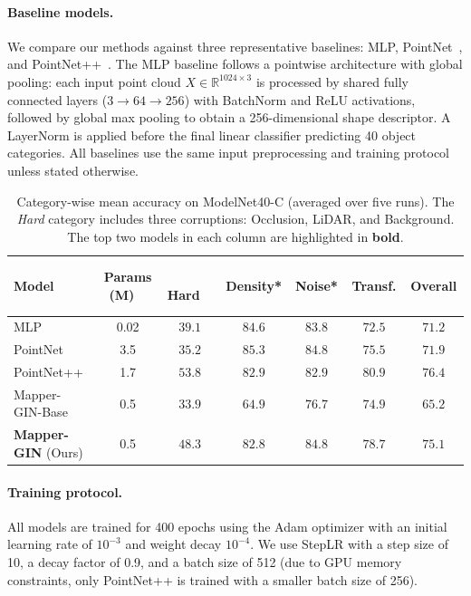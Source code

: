 \documentclass{article}
\begin{document}
\paragraph{Baseline models.}
We compare our methods against three representative baselines:
MLP, PointNet~\cite{pointnet2017}, and PointNet++~\cite{qi2017pointnetplusplus}.
The MLP baseline follows a pointwise architecture with global pooling:
each input point cloud $X\in\mathbb{R}^{1024\times 3}$ is processed by shared fully connected layers
($3 \rightarrow 64 \rightarrow 256$) with BatchNorm and ReLU activations,
followed by global max pooling to obtain a 256-dimensional shape descriptor.
A LayerNorm is applied before the final linear classifier predicting 40 object categories.
All baselines use the same input preprocessing and training protocol unless stated otherwise.

\begin{table}[t]
\centering
\scriptsize
\setlength{\tabcolsep}{2.0pt}
\renewcommand{\arraystretch}{1.3}
\begin{tabular}{l c|c c c c | c}
\toprule
Model & \!\!\!\!\!Params (M) \ & \,\,\, Hard\,\,\,\,\,\, & Density* & \, Noise* \, & \, Transf. \, & \, Overall \, \\
\midrule
MLP & 0.02 & $39.1$ & $\mathbf{84.6}$ & $83.8$ & $72.5$ & $71.2$ \\
PointNet & 3.5  & $35.2$ & $\mathbf{85.3}$ & $\mathbf{84.8}$ & $75.5$ & $71.9$ \\
PointNet++ & 1.7 & $\mathbf{53.8}$ & $82.9$ & $82.9$ & \, $\mathbf{80.9}$ \, & $\mathbf{76.4}$ \\
Mapper-GIN-Base & 0.5 & $33.9$ & $64.9$ & $76.7$ & $74.9$ & $65.2$ \\
\textbf{Mapper-GIN} (Ours) & 0.5 & $\mathbf{48.3}$ & $82.8$ & $\mathbf{84.8}$ & $\mathbf{78.7}$ & $\mathbf{75.1}$ \\
\bottomrule
\end{tabular}
\vspace{3mm}
\caption{\small Category-wise mean accuracy on ModelNet40-C (averaged over five runs). The \emph{Hard} category includes three corruptions: Occlusion, LiDAR, and Background. The top two models in each column are highlighted in \textbf{bold}.}
\label{tab1}
\end{table}
\paragraph{Training protocol.}
All models are trained for 400 epochs using the Adam optimizer with an initial learning rate of $10^{-3}$
and weight decay $10^{-4}$.
We use StepLR with a step size of 10, a decay factor of 0.9, and a batch size of 512
(due to GPU memory constraints, only PointNet++ is trained with a smaller batch size of 256).
\end{document}
